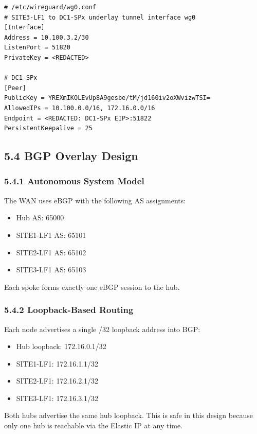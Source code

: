 \documentclass[11pt]{article}
\begin{document}
\begin{verbatim}
# /etc/wireguard/wg0.conf
# SITE3-LF1 to DC1-SPx underlay tunnel interface wg0
[Interface]
Address = 10.100.3.2/30
ListenPort = 51820
PrivateKey = <REDACTED>

# DC1-SPx
[Peer]
PublicKey = YREXmIKOLEvUp8A9gesbe/tM/jd160iv2oXWvizwTSI=
AllowedIPs = 10.100.0.0/16, 172.16.0.0/16
Endpoint = <REDACTED: DC1-SPx EIP>:51822
PersistentKeepalive = 25
\end{verbatim}

\subsection{5.4 BGP Overlay Design}
\label{sec:bgp-overlay-design}

\subsubsection{5.4.1 Autonomous System Model}
\label{sec:bgp-as-model}

The WAN uses eBGP with the following AS assignments:

\begin{itemize}
  \item Hub AS: 65000
  \item SITE1-LF1 AS: 65101
  \item SITE2-LF1 AS: 65102
  \item SITE3-LF1 AS: 65103
\end{itemize}

Each spoke forms exactly one eBGP session to the hub.

\subsubsection{5.4.2 Loopback-Based Routing}
\label{sec:bgp-loopbacks}

Each node advertises a single /32 loopback address into BGP:

\begin{itemize}
  \item Hub loopback: 172.16.0.1/32
  \item SITE1-LF1: 172.16.1.1/32
  \item SITE2-LF1: 172.16.2.1/32
  \item SITE3-LF1: 172.16.3.1/32
\end{itemize}

Both hubs advertise the same hub loopback. This is safe in this design because only one hub is reachable via the Elastic IP at any time.
\end{document}
